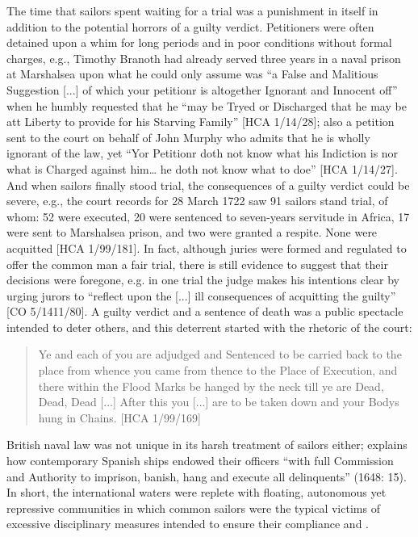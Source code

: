 The time that sailors spent waiting for a trial was a punishment in itself in addition to the potential horrors of a guilty verdict. Petitioners were often detained upon a whim for long periods and in poor conditions without formal charges, e.g., Timothy Branoth had already served three years in a naval prison at Marshalsea upon what he could only assume was “a False and Malitious Suggestion [...] of which your petitionr is altogether Ignorant and Innocent off” when he humbly requested that he “may be Tryed or Discharged that he may be att Liberty to provide for his Starving Family” [HCA 1/14/28]; also a petition sent to the court on behalf of John Murphy who admits that he is wholly ignorant of the law, yet “Yor Petitionr doth not know what his Indiction is nor what is Charged against him… he doth not know what to doe” [HCA 1/14/27]. And when sailors finally stood trial, the consequences of a guilty verdict could be severe, e.g., the court records for 28 {March 1722} saw 91 sailors stand trial, of whom: 52 were executed, 20 were sentenced to seven-years servitude in Africa, 17 were sent to Marshalsea prison, and two were granted a respite. None were acquitted [HCA 1/99/181]. In fact, although juries were formed and regulated to offer the common man a fair trial, there is still evidence to suggest that their decisions were foregone, e.g. in one trial the judge makes his intentions clear by urging jurors to “reflect upon the [...] ill consequences of acquitting the guilty” [CO 5/1411/80]. A guilty verdict and a sentence of death was a public spectacle intended to deter others, and this deterrent started with the rhetoric of the court: 

\begin{quotation}
Ye and each of you are adjudged and Sentenced to be carried back to the place from whence you came from thence to the Place of Execution, and there within the Flood Marks be hanged by the neck till ye are Dead, Dead, Dead [...] After this you [...] are to be taken down and your Bodys hung in Chains. [HCA 1/99/169] 
\end{quotation}

British naval law was not unique in its harsh treatment of sailors either; \citeauthor{Gage1648} explains how contemporary Spanish ships endowed their officers “with full Commission and Authority to imprison, banish, hang and execute all delinquents” (1648: 15). In short, the international waters were replete with floating, autonomous yet repressive communities in which common sailors were the typical victims of excessive disciplinary measures intended to ensure their compliance and . 

